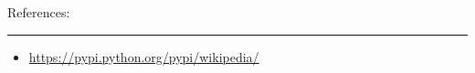 \documentclass{article}
\newcommand{\problemline}{\rule{\textwidth}{0.25mm}}
\theoremstyle{mystuff}
\theoremstyle{myexample}
\theoremstyle{named}
\begin{document}

References:\\
\problemline
\begin{itemize}
   \item \url{https://pypi.python.org/pypi/wikipedia/}
\end{itemize}

%
%
\end{document}
